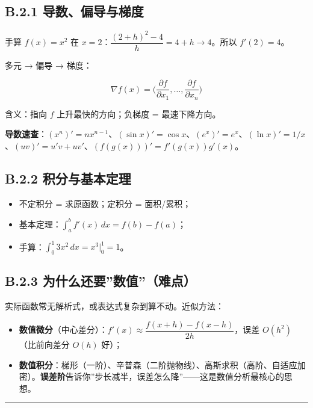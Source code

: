 \subsection{B.2.1
导数、偏导与梯度}\label{b.2.1-ux5bfcux6570ux504fux5bfcux4e0eux68afux5ea6}

手算 \(f(x)=x^2\) 在 \(x=2\)：\(\dfrac{(2+h)^2-4}{h}=4+h\to 4\)。所以
\(f'(2)=4\)。

多元 → 偏导 → 梯度：

\[\nabla f(x)=\Big(\frac{\partial f}{\partial x_1},\ldots,\frac{\partial f}{\partial x_n}\Big)\]

含义：指向 \(f\) 上升最快的方向；负梯度 = 最速下降方向。

\textbf{导数速查}：\((x^n)'=nx^{n-1}\)、\((\sin x)'=\cos x\)、\((e^x)'=e^x\)、\((\ln x)'=1/x\)、\((uv)'=u'v+uv'\)、\((f(g(x)))'=f'(g(x))g'(x)\)。

\subsection{B.2.2
积分与基本定理}\label{b.2.2-ux79efux5206ux4e0eux57faux672cux5b9aux7406}

\begin{itemize}
\tightlist
\item
  不定积分 = 求原函数；定积分 = 面积/累积；
\item
  基本定理：\(\int_a^b f'(x)\,dx = f(b)-f(a)\)；
\item
  手算：\(\int_0^1 3x^2\,dx = x^3\big|_0^1 = 1\)。
\end{itemize}

\subsection{B.2.3
为什么还要''数值''（难点）}\label{b.2.3-ux4e3aux4ec0ux4e48ux8fd8ux8981ux6570ux503cux96beux70b9}

实际函数常无解析式，或表达式复杂到算不动。近似方法：

\begin{itemize}
\tightlist
\item
  \textbf{数值微分}（中心差分）：\(f'(x)\approx\dfrac{f(x+h)-f(x-h)}{2h}\)，误差
  \(O(h^2)\)（比前向差分 \(O(h)\) 好）；
\item
  \textbf{数值积分}：梯形（一阶）、辛普森（二阶抛物线）、高斯求积（高阶、自适应加密）。\textbf{误差阶}告诉你''步长减半，误差怎么降''------这是数值分析最核心的思想。
\end{itemize}

\begin{center}\rule{0.5\linewidth}{0.5pt}\end{center}


